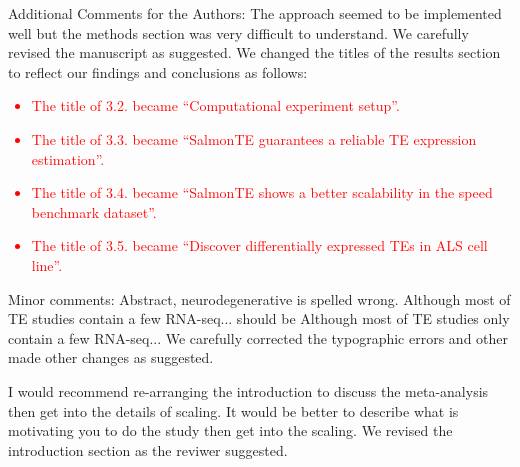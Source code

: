 \documentclass[10pt]{article}
\begin{document}
\begin{response}{Additional Comments for the Authors: The approach seemed to be implemented well but the methods section was very difficult to understand.}
We carefully revised the manuscript as suggested. We changed the titles of the results section to reflect our findings and conclusions as follows:

\textcolor{red}{
\begin{itemize}
	\item The title of 3.2. became ``Computational experiment setup''.
    \item The title of 3.3. became ``SalmonTE guarantees a reliable TE expression estimation''.
    \item The title of 3.4. became ``SalmonTE shows a better scalability in the speed benchmark dataset''.
	\item The title of 3.5. became ``Discover differentially expressed TEs in ALS cell line''.
\end{itemize}}
\end{response}

\begin{response}{
Minor comments: Abstract, neurodegenerative is spelled wrong. Although most of TE studies contain a few RNA-seq... should be Although most of TE studies only contain a few RNA-seq... 
}
We carefully corrected the typographic errors and other made other changes as suggested.
\end{response}

\begin{response}{
I would recommend re-arranging the introduction to discuss the meta-analysis then get into the details of scaling. It would be better to describe what is motivating you to do the study then get into the scaling. 
}
We revised the introduction section as the reviwer suggested.
\end{response}
\end{document}
